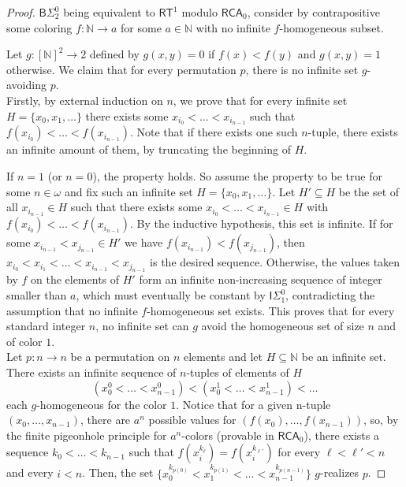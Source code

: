 \documentclass{article}
\numberwithin{theorem}{section}
\newcommand{\ISig}{\mathsf{I}\Sigma^0}
\newcommand{\BSig}{\mathsf{B}\Sigma^0}
\newcommand{\RCA}[0]{\mathsf{RCA}}
\newcommand{\RT}[0]{\mathsf{RT}}
\newcommand{\NN}[0]{\mathbb{N}}
\begin{document}
\begin{proof}
$\BSig_2$ being equivalent to $\RT^1$ modulo $\RCA_0$, consider by contrapositive some coloring $f : \NN \to a$ for some $a \in \NN$ with no infinite $f$-homogeneous subset.

Let $g : [\NN]^2 \to 2$ defined by $g(x,y) = 0$ if $f(x) < f(y)$ and $g(x,y) = 1$ otherwise. We claim that for every permutation $p$, there is no infinite set $g$-avoiding $p$. \\

Firstly, by external induction on $n$, we prove that for every infinite set $H = \{x_0, x_1, \dots \}$ there exists some $x_{i_0} < \dots < x_{i_{n-1}}$ such that $f(x_{i_0}) < \dots < f(x_{i_{n-1}})$. Note that if there exists one such $n$-tuple, there exists an infinite amount of them, by truncating the beginning of $H$. 

If $n = 1$ (or $n = 0$), the property holds. So assume the property to be true for some $n \in \omega$ and fix such an infinite set $H = \{x_0, x_1, \dots \}$. Let $H' \subseteq H$ be the set of all $x_{i_{n-1}} \in H$ such that there exists some $x_{i_0} < \dots < x_{i_{n-1}} \in H$ with $f(x_{i_0}) < \dots < f(x_{i_{n-1}})$. By the inductive hypothesis, this set is infinite. If for some $x_{i_{n-1}} < x_{j_{n-1}} \in H'$ we have $f(x_{i_{n-1}}) < f(x_{j_{n-1}})$, then $x_{i_0} < x_{i_1} < \dots < x_{i_{n-1}} < x_{j_{n-1}}$ is the desired sequence. Otherwise, the values taken by $f$ on the elements of $H'$ form an infinite non-increasing sequence of integer smaller than $a$, which must eventually be constant by $\ISig_1$, contradicting the assumption that no infinite $f$-homogeneous set exists.
This proves that for every standard integer $n$, no infinite set can $g$ avoid the homogeneous set of size $n$ and of color $1$. \\

Let $p : n \to n$ be a permutation on $n$ elements and let $H \subseteq \NN$ be an infinite set.
There exists an infinite sequence of $n$-tuples of elements of $H$
$$(x_0^0 < \dots < x_{n-1}^0) < (x_0^1 < \dots < x_{n-1}^1) < \dots$$
each $g$-homogeneous for the color $1$. Notice that for a given n-tuple $(x_0, \dots, x_{n-1})$, there are $a^n$ possible values for $(f(x_0), \dots, f(x_{n-1}))$, so, by the finite pigeonhole principle for $a^n$-colors (provable in $\RCA_0$), there exists a sequence $k_0 < \dots < k_{n-1}$ such that $f(x_i^{k_{\ell}}) = f(x_i^{k_{\ell'}})$ for every $\ell < \ell' < n$ and every $i < n$. Then, the set $\{x_0^{k_{p(0)}} < x_1^{k_{p(1)}} < \dots < x_{n-1}^{k_{p(n-1)}}\}$ $g$-realizes $p$.
\end{proof}
\end{document}
